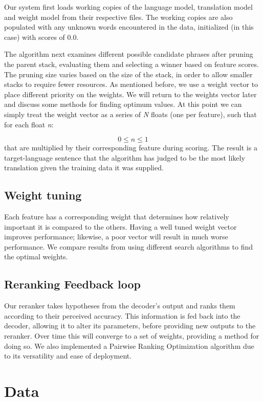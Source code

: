 \documentclass[11pt,letterpaper]{article}
\begin{document}
Our system first loads working copies of the language model, translation model and weight model from their respective files. The working copies are also populated with any unknown words encountered in the data, initialized (in this case) with scores of 0.0.

The algorithm next examines different possible candidate phrases after pruning the parent stack, evaluating them and selecting a winner based on feature scores. The pruning size varies based on the size of the stack, in order to allow smaller stacks to require fewer resources. As mentioned before, we use a weight vector to place different priority on the weights. We will return to the weights vector later and discuss some methods for finding optimum values. At this point we can simply treat the weight vector as a series of \textit{N} floats (one per feature), such that for each float \textit{n}:

\begin{displaymath}
0 \leq n \leq 1 
\end{displaymath}
 that are multiplied by their corresponding feature during scoring. The result is a target-language sentence that the algorithm has judged to be the most likely translation given the training data it was supplied.


\subsection{Weight tuning}
Each feature has a corresponding weight that determines how relatively important it is compared to the others. Having a well tuned weight vector improves performance; likewise, a poor vector will result in much worse performance. We compare results from using different search algorithms to find the optimal weights.


\subsection{Reranking Feedback loop}
Our reranker takes hypotheses from the decoder's output and ranks them according to their perceived accuracy. This information is fed back into the decoder, allowing it to alter its parameters, before providing new outputs to the reranker. Over time this will converge to a set of weights, providing a method for doing so. We also implemented a Pairwise Ranking Optimization algorithm \cite{HopkinsMay} due to its versatility and ease of deployment.

\section{Data}
\end{document}
